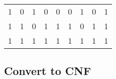 \documentclass{article}
\begin{document}
\begin{table}[h]
\begin{tabular}{lllllllll}
1 & 0 & 1 & 0                     & 0                     & 0                                                  &  1            & 0                                & 1                                                                                                                                                                                                     \\
1 & 1 & 0 & 1                     & 1                     & 1                                                  &  0            & 1                                & 1                                                                                                                                                                                                     \\
1 & 1 & 1 & 1                     & 1                     & 1                                                  &  1            & 1                                & 1                                                                                                                                                                                                    
\end{tabular}
\end{table}

\subsection*{Convert to CNF}
\end{document}
